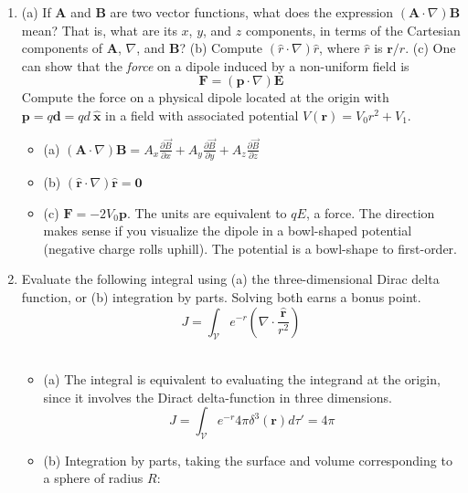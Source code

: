 \documentclass[10pt]{article}
\begin{document}
\begin{enumerate}
\item (a) If $\mathbf{A}$ and $\mathbf{B}$ are two vector functions, what does the expression $(\mathbf{A} \cdot \nabla) \mathbf{B}$ mean?  That is, what are its $x$, $y$, and $z$ components, in terms of the Cartesian components of $\mathbf{A}$, $\nabla$, and $\mathbf{B}$? (b) Compute $(\hat{r} \cdot \nabla) \hat{r}$, where $\hat{r}$ is $\mathbf{r}/r$. (c) One can show that the \textit{force} on a dipole induced by a non-uniform field is
\begin{equation}
\mathbf{F} = (\mathbf{p} \cdot \nabla) \mathbf{E}
\end{equation}
Compute the force on a physical dipole located at the origin with $\mathbf{p} = q \mathbf{d} = qd~\mathbf{\hat{x}}$ in a field with associated potential $V(\mathbf{r}) = V_0 r^2 + V_1$. \\
\begin{itemize}
\item (a) $(\mathbf{A}\cdot\nabla)\mathbf{B} = A_x \frac{\partial\vec{B}}{\partial x} + A_y \frac{\partial\vec{B}}{\partial y} + A_z \frac{\partial\vec{B}}{\partial z}$
\item (b) $(\hat{\mathbf{r}} \cdot \nabla)\hat{\mathbf{r}} = \mathbf{0}$
\item (c) $\mathbf{F} = -2 V_0 \mathbf{p}$.  The units are equivalent to $q E$, a force.  The direction makes sense if you visualize the dipole in a bowl-shaped potential (negative charge rolls uphill).  The potential is a bowl-shape to first-order.
\end{itemize}
\item Evaluate the following integral using (a) the three-dimensional Dirac delta function, or (b) integration by parts.  Solving both earns a bonus point.
\begin{equation}
J = \int_{\mathcal{V}} e^{-r} \left( \nabla \cdot \frac{\mathbf{\hat{r}}}{r^2} \right)
\end{equation} \\ 
\begin{itemize}
\item (a) The integral is equivalent to evaluating the integrand at the origin, since it involves the Diract delta-function in three dimensions.
\begin{equation}
J = \int_\mathcal{V} e^{-r} 4\pi \delta^3(\mathbf{r}) d\tau' = 4\pi
\end{equation}
\item (b) Integration by parts, taking the surface and volume corresponding to a sphere of radius $R$:

\end{itemize}
\end{enumerate}
\end{document}
